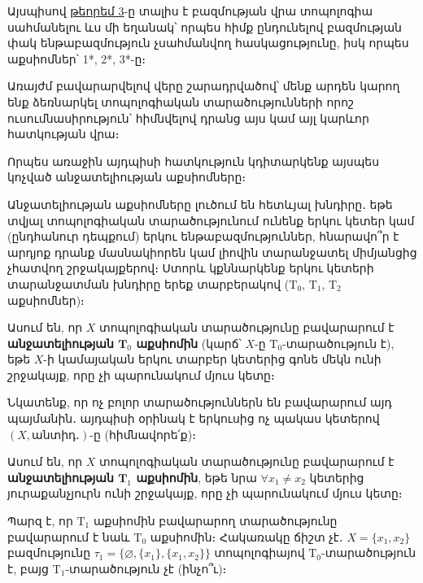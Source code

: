 \documentclass[./main.tex]{subfiles}
\begin{document}
\par Այսպիսով \hyperref[ch5thm3]{թեորեմ 3}-ը  տալիս է բազմության վրա տոպո\-լոգիա սահմանելու ևս մի եղանակ՝ որպես հիմք ընդունելով բազմության փակ ենթաբազմություն չսահմանվող հասկացությունը, իսկ որպես աքսիոմներ՝ 1*, 2*, 3*-ը։

\par Առայժմ բավարարվելով վերը շարադրվածով՝ մենք արդեն կարող ենք ձեռնարկել տոպոլոգիական տարածությունների որոշ ուսումնասիրություն՝ հիմնվելով դրանց այս կամ այլ կարևոր հատկության վրա։

\par Որպես առաջին այդպիսի հատկություն կդիտարկենք այսպես կոչված անջա\-տե\-լի\-ության աքսիոմները։

\par Անջատելիության աքսիոմները լուծում են հետևյալ խնդիրը․ եթե տվյալ տո\-պո\-լո\-գիա\-կան տարածությունում ունենք երկու կետեր կամ (ընդհանուր դեպքում) երկու ենթաբազմություններ, հնարավո՞ր է արդյոք դրանք մասնակիորեն կամ լիովին տար\-ան\-ջատել միմյանցից չհատվող շրջակայքերով։ Ստորև կքննարկենք երկու կե\-տե\-րի տարանջատման խնդիրը երեք տարբերակով ($\textrm{T}_0$, $\textrm{T}_1$, $\textrm{T}_2$ աքսիոմներ)։


\begin{definition} Ասում են, որ $X$ տոպոլոգիական տարածությունը բավարարում է \textbf{անջատելիության $\boldsymbol{\textrm{T}}_0$ աքսիոմին} (կարճ՝ $X$-ը $\textrm{T}_0$-տարածություն է), եթե $X$-ի կամայական երկու տարբեր կետերից գոնե մեկն ունի շրջակայք, որը չի պա\-րու\-նա\-կում մյուս կետը։
\end{definition}

\par Նկատենք, որ ոչ բոլոր տարածություններն են բավարարում այդ պայմանին․ այդպիսի օրինակ է երկուսից ոչ պակաս կետերով $(X, \textrm{անտիդ․})$-ը (հիմնավորե՛ք)։

\begin{definition} Ասում են, որ $X$ տոպոլոգիական տարածությունը բավարարում է \textbf{անջատելիության $\boldsymbol{\textrm{T}}_1$ աքսիոմին}, եթե նրա $\forall x_1 \neq x_2$ կետերից յուրաքանչյուրն ունի շրջակայք, որը չի պարունակում մյուս կետը։
\end{definition}

\par Պարզ է, որ $\textrm{T}_1$ աքսիոմին բավարարող տարածությունը բավարարում է նաև $\textrm{T}_0$ աքսիոմին։ Հակառակը ճիշտ չէ․ $X=\{ x_1,x_2 \}$ բազմությունը $\tau_1= \{\varnothing, \{x_1\}, \{x_1,x_2\}\}$ տոպոլոգիայով $\textrm{T}_0$-տարածություն է, բայց $\textrm{T}_1$-տարածություն չէ (ինչո՞ւ)։
\end{document}

